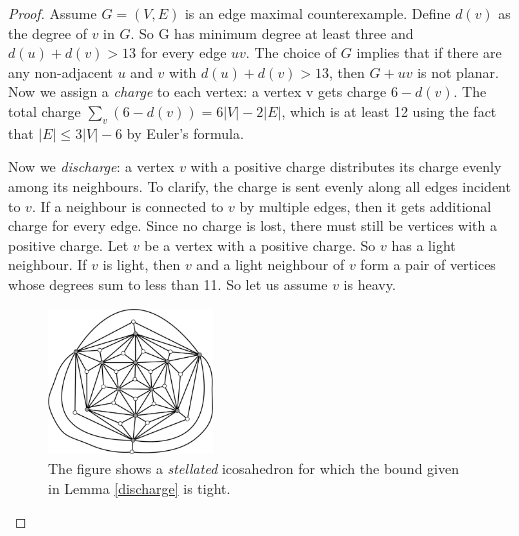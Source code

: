 \documentclass{article}
\newcommand{\0}{\mathbb{0}}
\newcommand{\1}{\mathbb{1}}
\begin{document}
\begin{proof}
 Assume $ G=(V,E)$ is an edge maximal counterexample. Define  $d(v)$ as the degree of $v$ in $G$. So G has minimum degree at least three and $d(u)+d(v) > 13$  for every edge $uv$. The choice of $G$ implies that if there are any non-adjacent $u$ and $v$ with $d(u)+d(v)>13$, then $G+uv$ is not planar. Now we assign a \emph{charge} to each vertex: a vertex v gets charge $6-d(v)$. The total charge $\sum_v (6-d(v)) = 6|V| -2|E| $, which is at least 12 using the fact that $|E| \leq 3|V|- 6$ by Euler's formula.
 
  Now we \emph{discharge}: a vertex $v$ with a positive charge distributes its charge evenly among its neighbours. To clarify, the charge is sent evenly along all edges incident to $v$. If a neighbour is connected to $v$ by multiple edges, then it gets additional charge for every edge. Since no charge is lost, there must still be vertices with a positive charge. Let $v$ be a vertex with a positive charge. So $v$ has a light neighbour. If $v$ is light, then $v$ and  a light neighbour of $v$ form a pair of vertices whose degrees sum to less than 11. So let us assume $v$ is heavy.
  
 \begin{figure}
  \begin{center}
   \includegraphics[width=0.39\textwidth]{StellatedIcosehedron.pdf}
   \end{center}
   \caption{\label{StellatedIco} The figure shows a {\em stellated} icosahedron for which the bound given in
   Lemma \ref{discharge} is tight.}
 \end{figure}


\end{proof}
\end{document}
